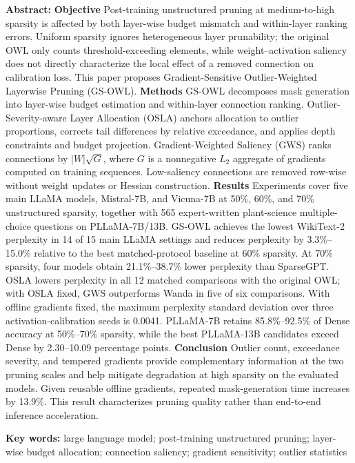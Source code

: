 \documentclass[UTF8,fontset=fandol]{ctexart}
\begin{document}
\vspace{4pt}
\noindent\textbf{Abstract:}
\textbf{Objective}\quad
Post-training unstructured pruning at medium-to-high sparsity is affected by both layer-wise budget mismatch and
within-layer ranking errors. Uniform sparsity ignores heterogeneous layer prunability; the original OWL only counts
threshold-exceeding elements, while weight--activation saliency does not directly characterize the local effect of a
removed connection on calibration loss. This paper proposes Gradient-Sensitive Outlier-Weighted Layerwise Pruning (GS-OWL).
\textbf{Methods}\quad
GS-OWL decomposes mask generation into layer-wise budget estimation and within-layer connection ranking.
Outlier-Severity-aware Layer Allocation (OSLA) anchors allocation to outlier proportions, corrects tail differences by
relative exceedance, and applies depth constraints and budget projection. Gradient-Weighted Saliency (GWS) ranks
connections by $\lvert W\rvert\sqrt{G}$, where $G$ is a nonnegative $L_2$ aggregate of gradients computed on training
sequences. Low-saliency connections are removed row-wise without weight updates or Hessian construction.
\textbf{Results}\quad
Experiments cover five main LLaMA models, Mistral-7B, and Vicuna-7B at 50\%, 60\%, and 70\% unstructured sparsity, together with
565 expert-written plant-science multiple-choice questions on PLLaMA-7B/13B. GS-OWL achieves
the lowest WikiText-2 perplexity in 14 of 15 main LLaMA settings and reduces perplexity by 3.3\%--15.0\% relative to the
best matched-protocol baseline at 60\% sparsity. At 70\% sparsity, four models obtain 21.1\%--38.7\% lower perplexity
than SparseGPT. OSLA lowers perplexity in all 12 matched comparisons with the original OWL; with OSLA fixed, GWS
outperforms Wanda in five of six comparisons. With offline gradients fixed, the maximum perplexity standard deviation
over three activation-calibration seeds is 0.0041. PLLaMA-7B retains 85.8\%--92.5\% of Dense accuracy at 50\%--70\%
sparsity, while the best PLLaMA-13B candidates exceed Dense by 2.30--10.09 percentage points.
\textbf{Conclusion}\quad
Outlier count, exceedance severity, and tempered gradients provide complementary information at the two pruning scales
and help mitigate degradation at high sparsity on the evaluated models. Given reusable offline gradients, repeated
mask-generation time increases by 13.9\%. This result characterizes pruning quality rather than end-to-end inference acceleration.

\noindent\textbf{Key words:}
large language model; post-training unstructured pruning; layer-wise budget allocation; connection saliency; gradient sensitivity; outlier statistics
\end{document}
